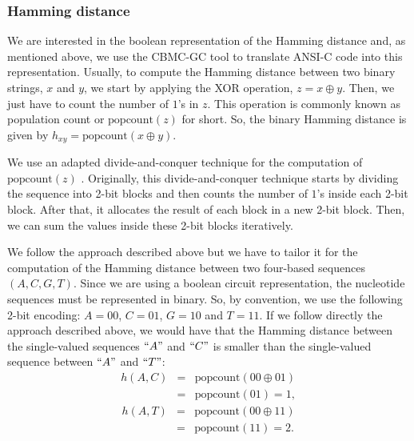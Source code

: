 \subsubsection{Hamming distance}

We are interested in the boolean representation of the Hamming distance and, as mentioned above, we use the CBMC-GC tool to translate ANSI-C code into this representation. Usually, to compute the Hamming distance between two binary strings, $x$ and $y$, we start by applying the XOR operation, $z = x \oplus y$. Then, we just have to count the number of $1$'s in $z$. This operation is commonly known as population count or $\text{popcount}(z)$ for short. So, the binary Hamming distance is given by $h_{xy} = \text{popcount}(x \oplus y)$.

We use an adapted divide-and-conquer technique for the computation of $\text{popcount}(z)$ \cite{W12}. Originally, this divide-and-conquer technique starts by dividing the sequence into 2-bit blocks and then counts the number of $1$'s inside each 2-bit block. After that, it allocates the result of each block in a new 2-bit block. Then, we can sum the values inside these 2-bit blocks iteratively. %

We follow the approach described above but we have to tailor it for the computation of the Hamming distance between two four-based sequences $(A, C, G, T)$. Since we are using a boolean circuit representation, the nucleotide sequences must be represented in binary. So, by convention, we use the following 2-bit encoding: $A = 00$, $C=01$, $G=10$ and $T=11$. If we follow directly the approach described above, we would have that the Hamming distance between the single-valued sequences $``A"$ and $``C"$ is smaller than the single-valued sequence between $``A"$ and $``T"$:
\begin{eqnarray*}
h(A, C) &=& \text{popcount}(00 \oplus 01)\\
&=& \text{popcount}(01) = 1,
\end{eqnarray*}
\begin{eqnarray*}
h(A, T) &=& \text{popcount}(00 \oplus 11)\\
&=& \text{popcount}(11) = 2.
\end{eqnarray*}

